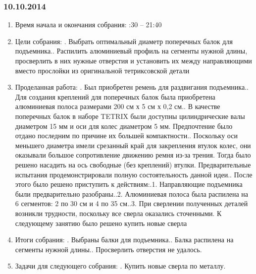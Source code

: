 \documentclass[11pt]{article}
\begin{document}
         \subsubsection{10.10.2014}
         \begin{enumerate}
            \item Время начала и окончания собрания:
            :30 – 21:40
            \item Цели собрания:
            .   Выбрать оптимальный диаметр поперечных балок для подъемника..   Распилить алюминиевый профиль на сегменты нужной длины, просверлить в них нужные отверстия и установить их между направляющими вместо прослойки из оригинальной тетриксовской детали
            \newline
            \item Проделанная работа:
            .   Был приобретен ремень для раздвигания подъемника..   Для создания креплений для поперечных балок была приобретена алюминиевая полоса размерами 200 см х 5 см х 0,2 см..   В качестве поперечных балок в наборе TETRIX были доступны цилиндрические валы диаметром 15 мм и оси для колес диаметром 5 мм. Предпочтение было отдано последним по причине их большей компактности..   Поскольку оси меньшего диаметра имели срезанный край для закрепления втулок колес, они оказывали большое сопротивление движению ремня из-за трения. Тогда было решено насадить на ось свободные (без креплений) втулки. Предварительные испытания продемонстрировали полную состоятельность данной идеи..   После этого было решено приступить к действиям:.1.   Направляющие подъемника были предварительно разобраны..2.   Алюминиевая полоса была распилена на 6 сегментов: 2 по 30 см и 4 по 35 см..3.   При сверлении полученных деталей возникли трудности, поскольку все сверла оказались сточенными. К следующему занятию было решено купить новые сверла
            \newline
            \item Итоги собрания:
            .   Выбраны балки для подъемника..   Балка распилена на сегменты нужной длины..   Просверлить отверстия не удалось.
            \newline
            \item Задачи для следующего собрания:
            .   Купить новые сверла по металлу.
         \end{enumerate}
         \newpage
\end{document}
